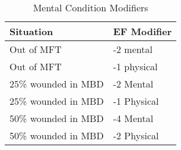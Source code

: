 \begin{table}[hb]
\caption{Mental Condition Modifiers}
\centering
	\begin{tabular}{||l|l||} \hline
	Situation			& EF Modifier	\\ \hline
	Out of MFT 			& -2 mental 	\\
	Out of MFT			& -1 physical	\\
	25\% wounded in MBD & -2 Mental		\\
	25\% wounded in MBD	& -1 Physical 	\\
	50\% wounded in MBD & -4 Mental		\\
	50\% wounded in MBD & -2 Physical	\\ \hline
	\end{tabular}
\end{table}
